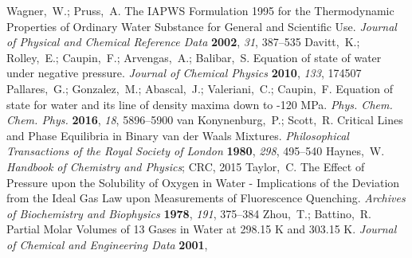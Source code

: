 \documentclass[aps,prl,twocolumn,superscriptaddress,groupedaddress]{revtex4}
\begin{document}
\begin{mcitethebibliography}{15}
Wagner,~W.; Pruss,~A. The IAPWS Formulation 1995 for the Thermodynamic
  Properties of Ordinary Water Substance for General and Scientific Use.
  \emph{Journal of Physical and Chemical Reference Data} \textbf{2002},
  \emph{31}, 387--535\relax
\mciteBstWouldAddEndPuncttrue
\mciteSetBstMidEndSepPunct{\mcitedefaultmidpunct}
{\mcitedefaultendpunct}{\mcitedefaultseppunct}\relax
\EndOfBibitem
{}
Davitt,~K.; Rolley,~E.; Caupin,~F.; Arvengas,~A.; Balibar,~S. Equation of state
  of water under negative pressure. \emph{Journal of Chemical Physics}
  \textbf{2010}, \emph{133}, 174507\relax
\mciteBstWouldAddEndPuncttrue
\mciteSetBstMidEndSepPunct{\mcitedefaultmidpunct}
{\mcitedefaultendpunct}{\mcitedefaultseppunct}\relax
\EndOfBibitem
{}
Pallares,~G.; Gonzalez,~M.; Abascal,~J.; Valeriani,~C.; Caupin,~F. Equation of
  state for water and its line of density maxima down to -120 MPa. \emph{Phys.
  Chem. Chem. Phys.} \textbf{2016}, \emph{18}, 5896--5900\relax
\mciteBstWouldAddEndPuncttrue
\mciteSetBstMidEndSepPunct{\mcitedefaultmidpunct}
{\mcitedefaultendpunct}{\mcitedefaultseppunct}\relax
\EndOfBibitem
{}
van Konynenburg,~P.; Scott,~R. Critical Lines and Phase Equilibria in Binary
  van der Waals Mixtures. \emph{Philosophical Transactions of the Royal Society
  of London} \textbf{1980}, \emph{298}, 495--540\relax
\mciteBstWouldAddEndPuncttrue
\mciteSetBstMidEndSepPunct{\mcitedefaultmidpunct}
{\mcitedefaultendpunct}{\mcitedefaultseppunct}\relax
\EndOfBibitem
{}
Haynes,~W. \emph{Handbook of Chemistry and Physics}; CRC, 2015\relax
\mciteBstWouldAddEndPuncttrue
\mciteSetBstMidEndSepPunct{\mcitedefaultmidpunct}
{\mcitedefaultendpunct}{\mcitedefaultseppunct}\relax
\EndOfBibitem
{}
Taylor,~C. The Effect of Pressure upon the Solubility of Oxygen in Water -
  Implications of the Deviation from the Ideal Gas Law upon Measurements of
  Fluorescence Quenching. \emph{Archives of Biochemistry and Biophysics}
  \textbf{1978}, \emph{191}, 375--384\relax
\mciteBstWouldAddEndPuncttrue
\mciteSetBstMidEndSepPunct{\mcitedefaultmidpunct}
{\mcitedefaultendpunct}{\mcitedefaultseppunct}\relax
\EndOfBibitem
{}
Zhou,~T.; Battino,~R. Partial Molar Volumes of 13 Gases in Water at 298.15 K
  and 303.15 K. \emph{Journal of Chemical and Engineering Data} \textbf{2001},

\end{mcitethebibliography}
\end{document}
